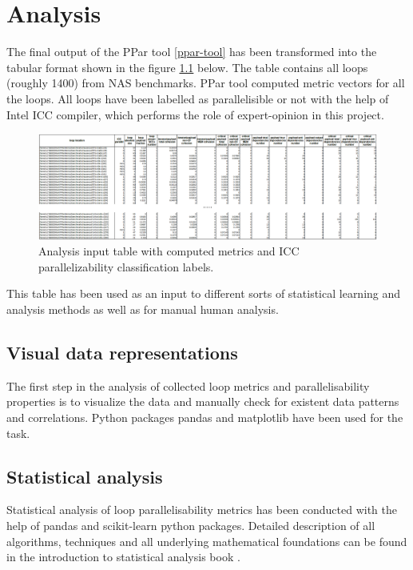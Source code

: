 \chapter{Analysis}

\qquad The final output of the PPar tool \ref{ppar-tool} has been transformed into the tabular format shown in the figure \ref{analysis-data-table} below. The table contains all loops (roughly 1400) from NAS benchmarks. PPar tool computed metric vectors for all the loops. All loops have been labelled as parallelisible or not with the help of Intel ICC compiler, which performs the role of expert-opinion in this project. 

\begin{figure}[htb]
	\centering
	\includegraphics[width=\linewidth]{figs/metrics-table.png}
	\caption{Analysis input table with computed metrics and ICC parallelizability classification labels.}
	\label{analysis-data-table}
\end{figure}
  
This table has been used as an input to different sorts of statistical learning and analysis methods as well as for manual human analysis. 

\section{Visual data representations}
\qquad The first step in the analysis of collected loop metrics and parallelisability properties is to visualize the data and manually check for existent data patterns and correlations. Python packages pandas \cite{python-lib-pandas} and matplotlib \cite{python-matplotlib} have been used for the task. 


\section{Statistical analysis}

\qquad Statistical analysis of loop parallelisability metrics has been conducted with the help of pandas \cite{python-lib-pandas} and scikit-learn \cite{python-lib-scikit-learn} python packages. Detailed description of all algorithms, techniques and all underlying mathematical foundations can be found in the introduction to statistical analysis book \cite{statistical-learning-book}.

